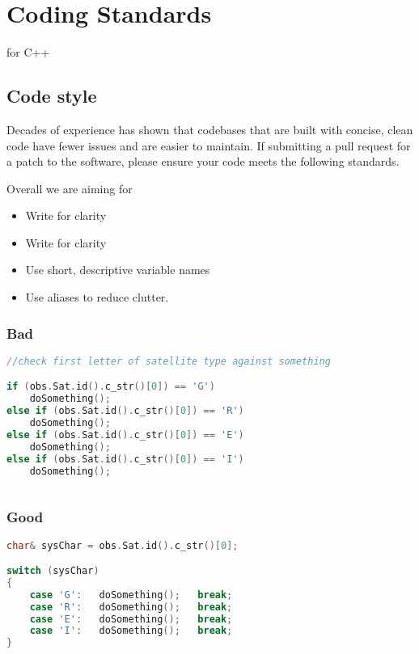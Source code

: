 \chapter{Coding Standards}
\label{ch:coding_standards}

 for C++

\section{Code style}
Decades of experience has shown that codebases that are built with concise, clean code have fewer issues and are easier to maintain. If submitting a pull request for a patch to the software, please ensure your code meets the following standards.

Overall we are aiming for
\begin{itemize}
	\item  Write for clarity
	\item  Write for clarity
	\item  Use short, descriptive variable names
	\item  Use aliases to reduce clutter.
\end{itemize}

\subsection{Bad}
\begin{lstlisting}[language=C++]
//check first letter of satellite type against something

if (obs.Sat.id().c_str()[0]) == 'G') 
    doSomething(); 
else if (obs.Sat.id().c_str()[0]) == 'R')
    doSomething();
else if (obs.Sat.id().c_str()[0]) == 'E')
    doSomething();
else if (obs.Sat.id().c_str()[0]) == 'I')
    doSomething();
    
\end{lstlisting}

\subsection{Good}

\begin{lstlisting}[language=c++]
char& sysChar = obs.Sat.id().c_str()[0];

switch (sysChar)
{
    case 'G':   doSomething();   break;
    case 'R':   doSomething();   break;
    case 'E':   doSomething();   break;
    case 'I':   doSomething();   break;
}
\end{lstlisting}


